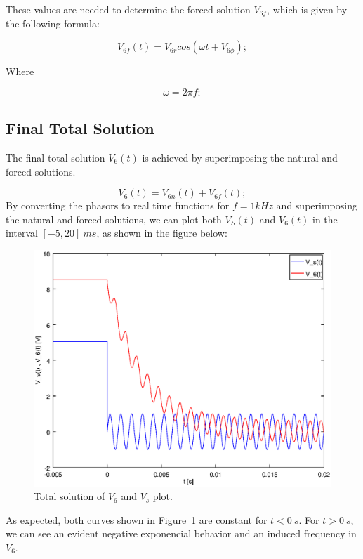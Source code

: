 These values are needed to determine the forced solution $V_{6f}$, which is given by the following formula:

\begin{equation}
V_{6f}(t)=V_{6r}cos(\omega t+V_{6\phi});
\end{equation}

Where

\begin{equation}
\omega=2\pi f;
\end{equation}


\subsection{Final Total Solution}


The final total solution $V_6(t)$ is achieved by superimposing the natural and forced solutions. 



\begin{equation}
	V_6(t)=V_{6n}(t)+V_{6f}(t);
\end{equation}
By converting the phasors to real time functions for $f = 1 kHz$ and superimposing the natural and forced solutions, we can plot both $V_S(t)$ and $V_6(t)$ in the interval $[-5, 20]~ms$, as shown in the figure below:

\clearpage

\begin{figure}[h] \centering
\includegraphics[width=0.7\linewidth]{total.eps}
\caption{Total solution of $V_{6}$ and $V_{s}$ plot.}
	\label{fig:total}
\end{figure}

As expected, both curves shown in Figure~\ref{fig:total} are constant for $t<0~s$. For $t>0~s$, we can see an evident negative exponencial behavior and an induced frequency in $V_{6}$.


